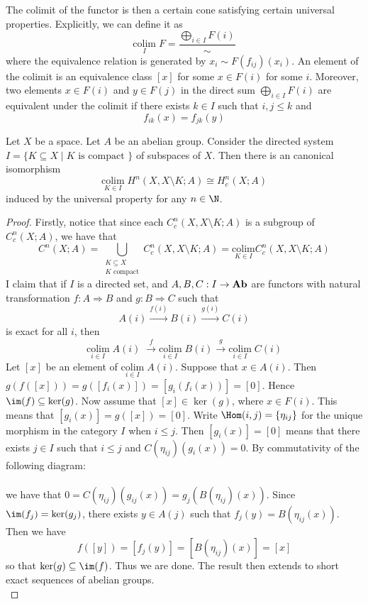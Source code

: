 \documentclass[a4paper]{article}
\begin{document}
The colimit of the functor is then a certain cone satisfying certain universal properties. Explicitly, we can define it as $$\underset{I}{\text{colim}}\;F=\frac{\bigoplus_{i\in I}F(i)}{\sim}$$ where the equivalence relation is generated by $x_i\sim F(f_{ij})(x_i)$. An element of the colimit is an equivalence class $[x]$ for some $x\in F(i)$ for some $i$. Moreover, two elements $x\in F(i)$ and $y\in F(j)$ in the direct sum $\bigoplus_{i\in I}F(i)$ are equivalent under the colimit if there exists $k\in I$ such that $i,j\leq k$ and $$f_{ik}(x)=f_{jk}(y)$$

\begin{prp}{}{} Let $X$ be a space. Let $A$ be an abelian group. Consider the directed system $I=\{K\subseteq X\;|\;K\text{ is compact }\}$ of subspaces of $X$. Then there is an canonical isomorphism $$\underset{K\in I}{\text{colim}}\;H^n(X,X\setminus K;A)\cong H_c^n(X;A)$$ induced by the universal property for any $n\in\N$. 
\begin{proof}
Firstly, notice that since each $C_c^n(X,X\setminus K;A)$ is a subgroup of $C_c^n(X;A)$, we have that $$C^n(X;A)=\bigcup_{\substack{K\subseteq X\\K\text{ compact}}}C_c^n(X,X\setminus K;A)=\underset{K\in I}{\text{colim}}C_c^n(X,X\setminus K;A)$$ I claim that if $I$ is a directed set, and $A,B,C:I\to\bold{Ab}$ are functors with natural transformation $f:A\Rightarrow B$ and $g:B\Rightarrow C$ such that $$A(i)\overset{f(i)}{\rightarrow}B(i)\overset{g(i)}{\rightarrow}C(i)$$ is exact for all $i$, then $$\underset{i\in I}{\text{colim}}\;A(i)\;\overset{f}{\rightarrow}\underset{i\in I}{\text{colim}}\;B(i)\overset{g}{\rightarrow}\underset{i\in I}{\text{colim}}\;C(i)$$ Let $[x]$ be an element of $\underset{i\in I}{\text{colim}}\;A(i)$. Suppose that $x\in A(i)$. Then $g(f([x]))=g([f_i(x)])=[g_i(f_i(x))]=[0]$. Hence $\im(f)\subseteq\ker(g)$. Now assume that $[x]\in\ker(g)$, where $x\in F(i)$. This means that $[g_i(x)]=g([x])=[0]$. Write $\Hom(i,j)=\{\eta_{ij}\}$ for the unique morphism in the category $I$ when $i\leq j$. Then $[g_i(x)]=[0]$ means that there exists $j\in I$ such that $i\leq j$ and $C(\eta_{ij})(g_i(x))=0$. By commutativity of the following diagram: \\
\\
we have that $0=C(\eta_{ij})(g_{ij}(x))=g_j(B(\eta_{ij})(x))$. Since $\im(f_j)=\ker(g_j)$, there exists $y\in A(j)$ such that $f_j(y)=B(\eta_{ij}(x))$. Then we have $$f([y])=[f_j(y)]=[B(\eta_{ij})(x)]=[x]$$ so that $\ker(g)\subseteq\im(f)$. Thus we are done. The result then extends to short exact sequences of abelian groups. \\


\end{proof}
\end{prp}
\end{document}

